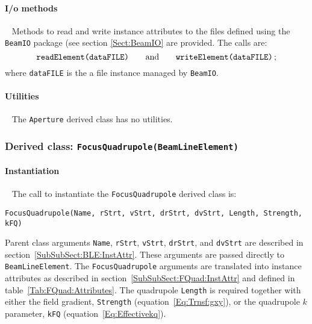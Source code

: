 \paragraph{I/o methods} ~\newline
\noindent
Methods to read and write instance attributes to the files defined
using the \texttt{BeamIO} package (see section \ref{Sect:BeamIO} are
provided.
The calls are:
\begin{equation}
  \texttt{readElement(dataFILE)} \quad \quad {\rm and }
      \quad \quad \texttt{writeElement(dataFILE)} \,; \nonumber
\end{equation}
where \texttt{dataFILE} is the a file instance managed by \texttt{BeamIO}.

\paragraph{Utilities} ~\newline
\noindent
The \texttt{Aperture} derived class has no utilities.

\FloatBarrier

\subsubsection{Derived class: \texttt{FocusQuadrupole(BeamLineElement)}}

\paragraph{Instantiation} ~\newline
\noindent
The call to instantiate the \texttt{FocusQuadrupole} derived class is:
\begin{center}
  \texttt{FocusQuadrupole(Name, rStrt, vStrt, drStrt, dvStrt, Length,
          Strength, kFQ)} 
\end{center}
Parent class arguments \texttt{Name}, \texttt{rStrt}, \texttt{vStrt},
\texttt{drStrt}, and \texttt{dvStrt} are described in
section~\ref{SubSubSect:BLE:InstAttr}.
These arguments are passed directly to \texttt{BeamLineElement}.
The \texttt{FocusQuadrupole} arguments are translated into instance
attributes as described in section~\ref{SubSubSect:FQuad:InstAttr} and
defined in table~\ref{Tab:FQuad:Attributes}.
The quadrupole \texttt{Length} is required together with
either the field gradient, \texttt{Strength}
(equation~\ref{Eq:Trnsf:gxy}), or the quadrupole $k$
parameter, \texttt{kFQ} (equation~\ref{Eq:Effectivekq}).

